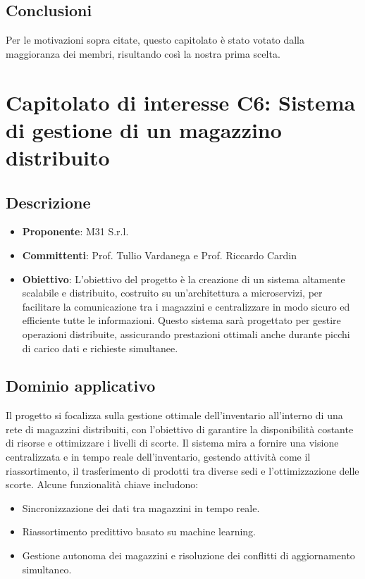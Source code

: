 \documentclass[italian, 12pt]{article}
\begin{document}
\subsection{Conclusioni}
Per le motivazioni sopra citate, questo capitolato è stato votato dalla maggioranza dei membri, risultando così la nostra prima scelta.

\section{Capitolato di interesse C6: Sistema di gestione di un magazzino distribuito}
\subsection{Descrizione}
\begin{itemize}
\item\textbf{Proponente}: M31 S.r.l.
\item\textbf{Committenti}: Prof. Tullio Vardanega e Prof. Riccardo Cardin
\item\textbf{Obiettivo}: L’obiettivo del progetto è la creazione di un sistema altamente scalabile e distribuito, costruito su un’architettura a microservizi, per facilitare la comunicazione tra i magazzini e centralizzare in modo sicuro ed efficiente tutte le informazioni. Questo sistema sarà progettato per gestire operazioni distribuite, assicurando prestazioni ottimali anche durante picchi di carico dati e richieste simultanee.
\end{itemize}

\subsection{Dominio applicativo}
Il progetto si focalizza sulla gestione ottimale dell'inventario all'interno di una rete di magazzini distribuiti, con l'obiettivo di garantire la disponibilità costante di risorse e ottimizzare i livelli di scorte. Il sistema mira a fornire una visione centralizzata e in tempo reale dell'inventario, gestendo attività come il riassortimento, il trasferimento di prodotti tra diverse sedi e l'ottimizzazione delle scorte. Alcune funzionalità chiave includono: 
\begin{itemize}
\item Sincronizzazione dei dati tra magazzini in tempo reale. 
\item Riassortimento predittivo basato su machine learning. \item Gestione autonoma dei magazzini e risoluzione dei conflitti di aggiornamento simultaneo.
\end{itemize}
\end{document}
